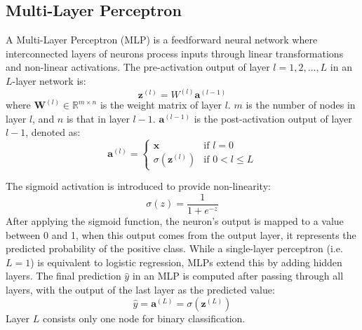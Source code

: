 \subsection{Multi-Layer Perceptron}

A Multi-Layer Perceptron (MLP) is a feedforward neural network where interconnected layers of neurons process inputs through linear transformations and non-linear activations. 
The pre-activation output of layer \(l = 1, 2, \ldots, L\) in an \(L\)-layer network is:
\begin{equation}
    \mathbf{z}^{(l)} = W^{(l)}\mathbf{a}^{(l-1)}
\end{equation}
where \(\mathbf{W}^{(l)} \in \mathbb{R}^{m \times n}\) is the weight matrix of layer \(l\). \(m\) is the number of nodes in layer \(l\), and \(n\) is that in layer \(l-1\). \(\mathbf{a}^{(l-1)}\) is the post-activation output of layer \(l-1\), denoted as: 
\begin{equation}
    \mathbf{a}^{(l)} = 
    \begin{cases} 
        \mathbf{x} & \text{if } l = 0 \\ 
        \sigma(\mathbf{z}^{(l)}) & \text{if } 0 < l \leq L 
    \end{cases}
\end{equation}

The sigmoid activation is introduced to provide non-linearity:
\begin{equation}
    \sigma(z) = \frac{1}{1 + e^{-z}}
\end{equation}
After applying the sigmoid function, the neuron’s output is mapped to a value between 0 and 1, when this output comes from the output layer, it represents the predicted probability of the positive class. While a single-layer perceptron (i.e. \(L=1\)) is equivalent to logistic regression, MLPs extend this by adding hidden layers. The final prediction \( \hat{y} \) in an MLP is computed after passing through all layers, with the output of the last layer as the predicted value:
\begin{equation}
    \hat{y} = \mathbf{a}^{(L)} = \sigma(\mathbf{z}^{(L)})
\end{equation}
Layer \(L\) consists only one node for binary classification.

